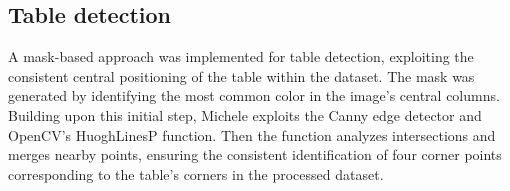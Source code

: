 \subsection{Table detection}

A mask-based approach was implemented for table detection, exploiting the consistent central positioning of the table within the dataset.  The mask was generated by identifying the most common color in the image's central columns.  Building upon this initial step, Michele exploits the Canny edge detector and OpenCV's HuoghLinesP function. Then the function analyzes intersections and merges nearby points, ensuring the consistent identification of four corner points corresponding to the table's corners in the processed dataset.
